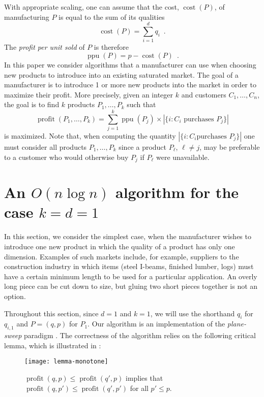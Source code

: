 \documentclass[lotsofwhite]{patmorin}
\newcommand{\cost}{\operatorname{cost}}
\newcommand{\ppu}{\operatorname{ppu}}
\newcommand{\val}{\operatorname{profit}}
\begin{document}
With appropriate scaling, one can assume that the cost, $\cost(P)$, of
manufacturing $P$ is equal to the sum of its qualities
\[
   \cost(P) = \sum_{i=1}^d q_i \enspace .
\]
The \emph{profit per unit sold} of $P$ is therefore
\[
   \ppu(P) = p-\cost(P) \enspace .
\]
In this paper we consider algorithms that a manufacturer can use when
choosing new products to introduce into an existing saturated market.
The goal of a manufacturer is to introduce 1 or more new products into
the market in order to maximize their profit.  More precisely, given
an integer $k$ and customers $C_1,\ldots,C_n$, the goal is to find $k$
products $P_1,\ldots,P_k$ such that 
\[
  \val(P_1,\ldots,P_k) = \sum_{j=1}^k \ppu(P_j)
    \times |\{i:\mbox{$C_i$ purchases $P_j$}\}|
\]
is maximized.  Note that, when computing the quantity $|\{i:\mbox{$C_i$
purchases $P_j$}\}|$ one must consider all products $P_1,\ldots,P_k$
since a product $P_\ell$, $\ell\neq j$, may be preferable to a
customer who would otherwise buy $P_j$ if $P_\ell$ were unavailable.

\section{An $O(n\log n)$ algorithm for the case $k=d=1$}

In this section, we consider the simplest case, when the manufacturer
wishes to introduce one new product in which the quality of a product
has only one dimension.  Examples of such markets include, for
example, suppliers to the construction industry in which items (steel
I-beams, finished lumber, logs) must have a certain minimum length to
be used for a particular application.  An overly long piece can be cut
down to size, but gluing two short pieces together is not an option.


Throughout this section, since $d=1$ and $k=1$, we will use the
shorthand $q_i$ for $q_{i,1}$ and $P=(q,p)$ for $P_1$.
Our algorithm is an implementation of the \emph{plane-sweep} paradigm
\cite{bsXX}.  The correctness of the algorithm relies on the following
critical lemma, which is illustrated in :
\begin{figure}
  \begin{center}
    \texttt{[image: lemma-monotone]}
  \end{center}
  \caption{$\val(q,p) \le \val(q',p)$ implies that $\val(q,p') \le
           \val(q',p')$ for all $p' \le p$.}
\end{figure}
\end{document}
